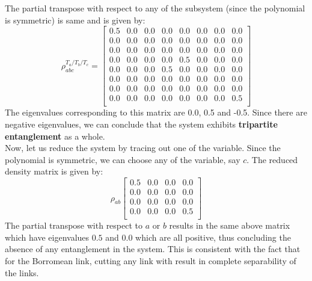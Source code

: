 \documentclass{scrartcl}
\begin{document}
    The partial transpose with respect to any of the subsystem (since the polynomial is symmetric) is same and is given by:
    \begin{equation}
        \rho^{T_a/T_b/T_c}_{abc} =
        \left[
        \begin{array}{cccccccc}
        0.5 & 0.0 & 0.0 & 0.0 & 0.0 & 0.0 & 0.0 & 0.0 \\
        0.0 & 0.0 & 0.0 & 0.0 & 0.0 & 0.0 & 0.0 & 0.0 \\
        0.0 & 0.0 & 0.0 & 0.0 & 0.0 & 0.0 & 0.0 & 0.0 \\
        0.0 & 0.0 & 0.0 & 0.0 & 0.5 & 0.0 & 0.0 & 0.0 \\
        0.0 & 0.0 & 0.0 & 0.5 & 0.0 & 0.0 & 0.0 & 0.0 \\
        0.0 & 0.0 & 0.0 & 0.0 & 0.0 & 0.0 & 0.0 & 0.0 \\
        0.0 & 0.0 & 0.0 & 0.0 & 0.0 & 0.0 & 0.0 & 0.0 \\
        0.0 & 0.0 & 0.0 & 0.0 & 0.0 & 0.0 & 0.0 & 0.5 \\
        \end{array}
        \right]
        \end{equation}
        The eigenvalues corresponding to this matrix are 0.0, 0.5 and -0.5. Since there are negative eigenvalues, we can conclude that the system exhibits \textbf{tripartite entanglement} as a whole.\\[0.3cm]
        Now, let us reduce the system by tracing out one of the variable. Since the polynomial is symmetric, we can choose any of the variable, say $c$. The reduced density matrix is given by:
        \begin{equation}
            \rho_{ab}
            \left[
            \begin{array}{cccc}
            0.5 & 0.0 & 0.0 & 0.0 \\
            0.0 & 0.0 & 0.0 & 0.0 \\
            0.0 & 0.0 & 0.0 & 0.0 \\
            0.0 & 0.0 & 0.0 & 0.5 \\
            \end{array}
            \right]
            \end{equation} 
            The partial transpose with respect to $a$ or $b$ results in the same above matrix which have eigenvalues $0.5$ and $0.0$ which are all positive, thus concluding the absence of any entanglement in the system. This is consistent with the fact that for the Borromean link, cutting any link with result in complete separability of the links. \\[0.3cm]
\end{document}

